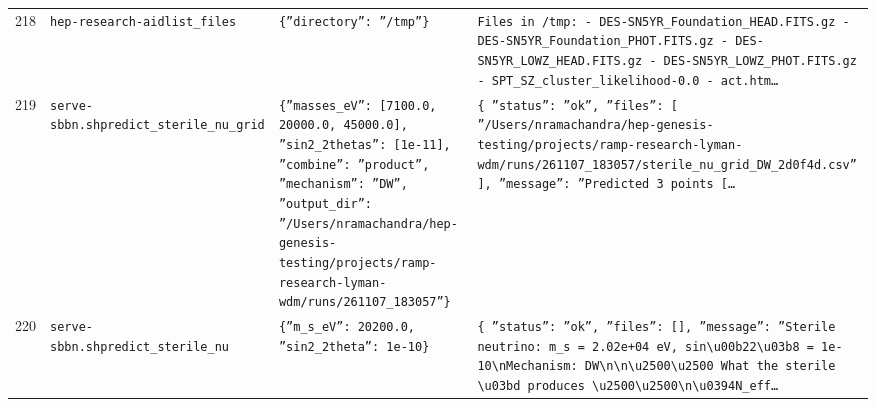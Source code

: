 \documentclass[11pt,a4paper]{article}
\begin{document}
\begin{longtable}{@{}p{}p{}p{}p{}@{}}
218 & \texttt{hep-research-aid}\newline\texttt{list\_\allowbreak{}files} & \texttt{\{''directory'':\allowbreak{} ''/\allowbreak{}tmp''\}\allowbreak{}} & \texttt{Files in /\allowbreak{}tmp:\allowbreak{}   - DES-SN5YR\_\allowbreak{}Foundation\_\allowbreak{}HEAD.FITS.gz   - DES-SN5YR\_\allowbreak{}Foundation\_\allowbreak{}PHOT.FITS.gz   - DES-SN5YR\_\allowbreak{}LOWZ\_\allowbreak{}HEAD.FITS.gz   - DES-SN5YR\_\allowbreak{}LOWZ\_\allowbreak{}PHOT.FITS.gz   - SPT\_\allowbreak{}SZ\_\allowbreak{}cluster\_\allowbreak{}likelihood-0.0   - act.htm\ldots{}\allowbreak{}} \\
219 & \texttt{serve-sbbn.sh}\newline\texttt{predict\_\allowbreak{}sterile\_\allowbreak{}nu\_\allowbreak{}grid} & \texttt{\{''masses\_\allowbreak{}eV'':\allowbreak{} [7100.0,\allowbreak{} 20000.0,\allowbreak{} 45000.0]\allowbreak{},\allowbreak{} ''sin2\_\allowbreak{}2thetas'':\allowbreak{} [1e-11]\allowbreak{},\allowbreak{} ''combine'':\allowbreak{} ''product'',\allowbreak{} ''mechanism'':\allowbreak{} ''DW'',\allowbreak{} ''output\_\allowbreak{}dir'':\allowbreak{} ''/\allowbreak{}Users/\allowbreak{}nramachandra/\allowbreak{}hep-genesis-testing/\allowbreak{}projects/\allowbreak{}ramp-research-lyman-wdm/\allowbreak{}runs/\allowbreak{}261107\_\allowbreak{}183057''\}\allowbreak{}} & \texttt{\{   ''status'':\allowbreak{} ''ok'',\allowbreak{}   ''files'':\allowbreak{} [     ''/\allowbreak{}Users/\allowbreak{}nramachandra/\allowbreak{}hep-genesis-testing/\allowbreak{}projects/\allowbreak{}ramp-research-lyman-wdm/\allowbreak{}runs/\allowbreak{}261107\_\allowbreak{}183057/\allowbreak{}sterile\_\allowbreak{}nu\_\allowbreak{}grid\_\allowbreak{}DW\_\allowbreak{}2d0f4d.csv''   ]\allowbreak{},\allowbreak{}   ''message'':\allowbreak{} ''Predicted 3 points [\ldots{}\allowbreak{}} \\
220 & \texttt{serve-sbbn.sh}\newline\texttt{predict\_\allowbreak{}sterile\_\allowbreak{}nu} & \texttt{\{''m\_\allowbreak{}s\_\allowbreak{}eV'':\allowbreak{} 20200.0,\allowbreak{} ''sin2\_\allowbreak{}2theta'':\allowbreak{} 1e-10\}\allowbreak{}} & \texttt{\{   ''status'':\allowbreak{} ''ok'',\allowbreak{}   ''files'':\allowbreak{} []\allowbreak{},\allowbreak{}   ''message'':\allowbreak{} ''Sterile neutrino:\allowbreak{} m\_\allowbreak{}s =\allowbreak{} 2.02e+04 eV,\allowbreak{} sin\textbackslash{}\allowbreak{}u00b22\textbackslash{}\allowbreak{}u03b8 =\allowbreak{} 1e-10\textbackslash{}\allowbreak{}nMechanism:\allowbreak{} DW\textbackslash{}\allowbreak{}n\textbackslash{}\allowbreak{}n\textbackslash{}\allowbreak{}u2500\textbackslash{}\allowbreak{}u2500 What the sterile \textbackslash{}\allowbreak{}u03bd produces \textbackslash{}\allowbreak{}u2500\textbackslash{}\allowbreak{}u2500\textbackslash{}\allowbreak{}n\textbackslash{}\allowbreak{}u0394N\_\allowbreak{}eff\ldots{}\allowbreak{}} \\

\end{longtable}
\end{document}
